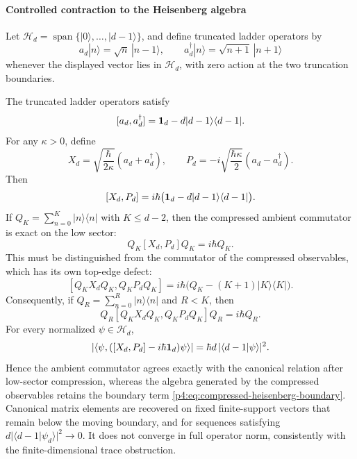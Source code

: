 \documentclass[12pt,a4paper]{article}
\begin{document}
\paragraph{Controlled contraction to the Heisenberg algebra}
\label{p4:sec:part2-heisenberg}

Let \(\mathcal H_d=\operatorname{span}\{|0\rangle,\ldots,|d-1\rangle\}\), and define
truncated ladder operators by
\[
a_d|n\rangle=\sqrt n\,|n-1\rangle,
\qquad
a_d^\dagger|n\rangle=\sqrt{n+1}\,|n+1\rangle
\]
whenever the displayed vector lies in \(\mathcal H_d\), with zero action at the two
truncation boundaries.

\begin{theorem}
\label{p4:thm:finite-heisenberg-contraction}
The truncated ladder operators satisfy
\[
[a_d,a_d^\dagger]=\mathbf{1}_d-d|d-1\rangle\langle d-1|.
\]
For any \(\kappa>0\), define
\[
X_d=\sqrt{\frac{\hbar}{2\kappa}}(a_d+a_d^\dagger),
\qquad
P_d=-i\sqrt{\frac{\hbar\kappa}{2}}(a_d-a_d^\dagger).
\]
Then
\begin{equation}
\label{p4:eq:heisenberg}
[X_d,P_d]=i\hbar\bigl(\mathbf{1}_d-d|d-1\rangle\langle d-1|\bigr).
\end{equation}
If \(Q_K=\sum_{n=0}^{K}|n\rangle\langle n|\) with \(K\le d-2\), then the compressed
ambient commutator is exact on the low sector:
\[
Q_K[X_d,P_d]Q_K=i\hbar Q_K.
\]
This must be distinguished from the commutator of the compressed observables,
which has its own top-edge defect:
\begin{equation}
\label{p4:eq:compressed-heisenberg-boundary}
[Q_KX_dQ_K,Q_KP_dQ_K]
=
i\hbar\bigl(Q_K-(K+1)|K\rangle\langle K|\bigr).
\end{equation}
Consequently, if \(Q_R=\sum_{n=0}^{R}|n\rangle\langle n|\) and \(R<K\), then
\[
Q_R[Q_KX_dQ_K,Q_KP_dQ_K]Q_R=i\hbar Q_R.
\]
For every normalized \(\psi\in\mathcal H_d\),
\[
\left|\langle\psi,([X_d,P_d]-i\hbar\mathbf{1}_d)\psi\rangle\right|
=\hbar d\,|\langle d-1|\psi\rangle|^2.
\]
Hence the ambient commutator agrees exactly with the canonical relation after
low-sector compression, whereas the algebra generated by the compressed
observables retains the boundary term
\eqref{p4:eq:compressed-heisenberg-boundary}.  Canonical matrix elements are
recovered on fixed finite-support vectors that remain below the moving
boundary, and for sequences satisfying
\(d|\langle d-1|\psi_d\rangle|^2\to0\).  It does not converge in full operator
norm, consistently with the finite-dimensional trace obstruction.
\end{theorem}
\end{document}
